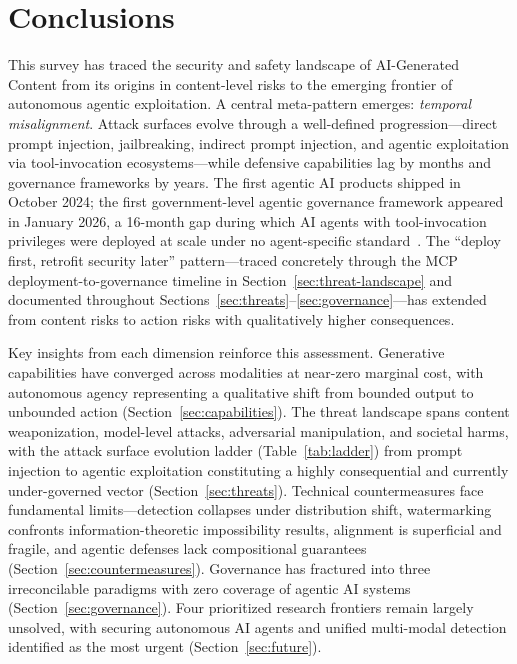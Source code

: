 
\section{Conclusions}
\label{sec:conclusions}

This survey has traced the security and safety landscape of AI-Generated Content from its origins in content-level risks to the emerging frontier of autonomous agentic exploitation. A central meta-pattern emerges: \emph{temporal misalignment}. Attack surfaces evolve through a well-defined progression---direct prompt injection, jailbreaking, indirect prompt injection, and agentic exploitation via tool-invocation ecosystems---while defensive capabilities lag by months and governance frameworks by years. The first agentic AI products shipped in October 2024; the first government-level agentic governance framework appeared in January 2026, a 16-month gap during which AI agents with tool-invocation privileges were deployed at scale under no agent-specific standard~\cite{imda2026agentic}. The ``deploy first, retrofit security later'' pattern---traced concretely through the MCP deployment-to-governance timeline in Section~\ref{sec:threat-landscape} and documented throughout Sections~\ref{sec:threats}--\ref{sec:governance}---has extended from content risks to action risks with qualitatively higher consequences.

Key insights from each dimension reinforce this assessment. Generative capabilities have converged across modalities at near-zero marginal cost, with autonomous agency representing a qualitative shift from bounded output to unbounded action (Section~\ref{sec:capabilities}). The threat landscape spans content weaponization, model-level attacks, adversarial manipulation, and societal harms, with the attack surface evolution ladder (Table~\ref{tab:ladder}) from prompt injection to agentic exploitation constituting a highly consequential and currently under-governed vector (Section~\ref{sec:threats}). Technical countermeasures face fundamental limits---detection collapses under distribution shift, watermarking confronts information-theoretic impossibility results, alignment is superficial and fragile, and agentic defenses lack compositional guarantees (Section~\ref{sec:countermeasures}). Governance has fractured into three irreconcilable paradigms with zero coverage of agentic AI systems (Section~\ref{sec:governance}). Four prioritized research frontiers remain largely unsolved, with securing autonomous AI agents and unified multi-modal detection identified as the most urgent (Section~\ref{sec:future}).

